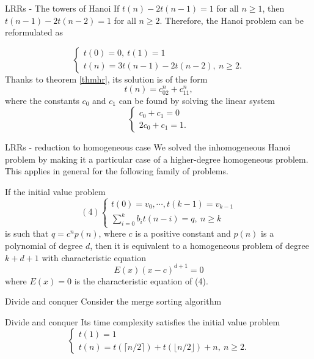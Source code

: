 \documentclass{beamer}
\begin{document}
\begin{frame}{LRRs - The towers of Hanoi}
	If $t(n) - 2t(n-1) = 1$ for all $n \geq 1$, then $t(n-1) - 2t(n-2) = 1$ for
	all $n \geq 2$. Therefore, the Hanoi problem can be reformulated as

	\begin{displaymath}
		\begin{cases}
			t(0)= 0,\ t(1)= 1\\
			t(n)= 3t(n-1) - 2t(n-2),\ n \geq 2.
		\end{cases}
	\end{displaymath}
	Thanks to theorem \ref{thmhr}, its solution is of the form
	\begin{equation*}
		t(n) = c_02^n + c_11^n,
	\end{equation*}
	where the constants $c_0$ and $c_1$ can be found by solving the linear
	system
	\begin{displaymath}
		\begin{cases}
			c_0 + c_1 = 0\\
			2c_0 + c_1 = 1.
		\end{cases}
	\end{displaymath}
\end{frame}

%

\begin{frame}{LRRs - reduction to homogeneous case}
	We solved the inhomogeneous Hanoi problem by making it a particular case
	of a higher-degree homogeneous problem. This applies in general for the
	following family of problems.
	\begin{thm}[2]
		If the initial value problem
		\begin{displaymath}(4)
			\begin{cases}
				t(0)= v_0, \cdots, t(k-1)= v_{k-1}\\
				\sum_{i= 0}^k b_it(n-i)= q,\ n \geq k
			\end{cases}
		\end{displaymath}
		is such that $q = c^np(n)$, where $c$ is a positive constant and
		$p(n)$ is a polynomial of degree $d$, then it is equivalent to a
		homogeneous problem of degree $k+d+1$ with characteristic equation
		\begin{equation}
			E(x)(x-c)^{d+1} = 0
		\end{equation}
		where $E(x) = 0$ is the characteristic equation of (4).
	\end{thm}
\end{frame}

\begin{frame}{Divide and conquer}
	Consider the merge sorting algorithm
	
\end{frame}

%

\begin{frame}{Divide and conquer}
	Its time complexity satisfies the initial value problem
	\begin{displaymath}
		\begin{cases}
			t(1)= 1\\
			t(n)= t\left( \lceil n/2 \rceil \right) +
			t\left( \lfloor n/2 \rfloor \right) + n,\ n \geq 2.
		\end{cases}
	\end{displaymath}
\end{frame}
\end{document}
